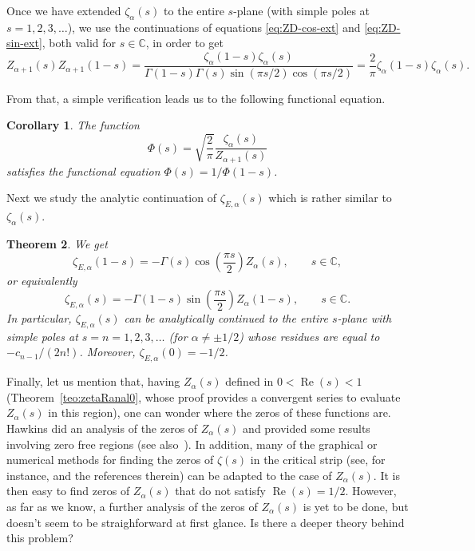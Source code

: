 \documentclass[a4paper]{amsart}
\newcommand{\C}{\mathbb{C}}
\renewcommand{\Re}{\operatorname{Re}}
\theoremstyle{plain}
\newtheorem{theorem}{Theorem}[section]
\newtheorem{corollary}[theorem]{Corollary}
\theoremstyle{definition}
\theoremstyle{remark}
\numberwithin{equation}{section}
\begin{document}
Once we have extended $\zeta_{\alpha}(s)$ to the entire $s$-plane (with simple poles at $s=1,2,3,\dots$), 
we use the continuations of equations \eqref{eq:ZD-cos-ext} and \eqref{eq:ZD-sin-ext}, both valid for $s\in\C$, in order to get
\begin{equation}
\label{eq:rel-ZD-ZR}
  Z_{\alpha+1}(s)Z_{\alpha+1}(1-s) 
  = \frac{\zeta_{\alpha}(1-s)\zeta_{\alpha}(s)}{\Gamma(1-s)\Gamma(s)\sin(\pi s/2)\cos(\pi s/2)}
  = \frac{2}{\pi} \zeta_{\alpha}(1-s)\zeta_{\alpha}(s).
\end{equation}

From that, a simple verification leads us to the following functional equation.

\begin{corollary}
The function
\[
\Phi(s) = \sqrt{\frac{2}{\pi}} \frac{\zeta_\alpha(s)}{Z_{\alpha+1}(s)}
\]
satisfies the functional equation $\Phi(s) = 1/\Phi(1-s)$.
\end{corollary}

Next we study the analytic continuation of $\zeta_{E,\alpha}(s)$ which is rather similar to $\zeta_\alpha(s)$.

\begin{theorem}
We get
\begin{equation}
\label{eq:ZDE-cos-ext}
\zeta_{E,\alpha}(1-s) = -\Gamma(s) \cos{\left(\frac{\pi s}{2}\right)} Z_{\alpha}(s), \qquad s \in \C,
\end{equation}
or equivalently
\begin{equation}
\label{eq:ZDE-sin-ext}
\zeta_{E,\alpha}(s) = -\Gamma(1-s) \sin{\left(\frac{\pi s}{2}\right)} Z_{\alpha}(1-s), \qquad s \in \C.
\end{equation}
In particular, $\zeta_{E,\alpha}(s)$ can be analytically continued to the entire $s$-plane with simple poles at $s = n = 1,2,3,\dots$ (for $\alpha\not = \pm 1/2$) whose residues are equal to $-c_{n-1}/(2n!)$. Moreover, $\zeta_{E,\alpha}(0) = -1/2$.
\end{theorem}

Finally, let us mention that, having $Z_{\alpha}(s)$ defined in $0<\Re(s)<1$ (Theorem~\ref{teo:zetaRanal0}, whose proof provides a convergent series to evaluate $Z_{\alpha}(s)$ in this region), one can wonder where the zeros of these functions are. Hawkins did an analysis of the zeros of $Z_{\alpha}(s)$ and provided some results involving zero free regions \cite[Section~2]{Haw} (see also~\cite{Act}). In addition, many of the graphical or numerical methods for finding the zeros of $\zeta(s)$ in the critical strip (see, for instance, \cite{Ar, ArLu} and the references therein) can be adapted to the case of $Z_{\alpha}(s)$. It is then easy to find zeros of $Z_{\alpha}(s)$ that do not satisfy $\Re(s)=1/2$. However, as far as we know, a further analysis of the zeros of $Z_\alpha(s)$ is yet to be done, but doesn't seem to be straighforward at first glance. Is there a deeper theory behind this problem?
\end{document}
